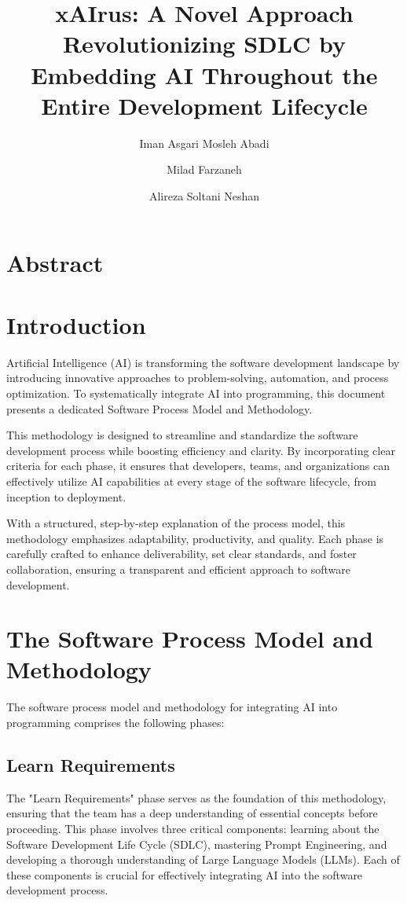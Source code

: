 \documentclass[14pt, a4paper]{article}
\title{xAIrus: A Novel Approach Revolutionizing SDLC by Embedding AI Throughout
the Entire Development Lifecycle}
\author{
    Iman Asgari Mosleh Abadi \and 
    Milad Farzaneh \and 
    Alireza Soltani Neshan
}
\begin{document}
\maketitle

\section{Abstract}

\section{Introduction}

Artificial Intelligence (AI) is transforming the software development landscape
by introducing innovative approaches to problem-solving, automation, and process
optimization. To systematically integrate AI into programming, this document
presents a dedicated Software Process Model and Methodology.

This methodology is designed to streamline and standardize the software
development process while boosting efficiency and clarity. By incorporating
clear criteria for each phase, it ensures that developers, teams, and
organizations can effectively utilize AI capabilities at every stage of the
software lifecycle, from inception to deployment.

With a structured, step-by-step explanation of the process model, this
methodology emphasizes adaptability, productivity, and quality. Each phase is
carefully crafted to enhance deliverability, set clear standards, and foster
collaboration, ensuring a transparent and efficient approach to software
development.

\tableofcontents

\section{The Software Process Model and Methodology}

The software process model and methodology for integrating AI into programming
comprises the following phases:

\subsection{Learn Requirements}

The "Learn Requirements" phase serves as the foundation of this methodology,
ensuring that the team has a deep understanding of essential concepts before
proceeding. This phase involves three critical components: learning about the
Software Development Life Cycle (SDLC), mastering Prompt Engineering, and
developing a thorough understanding of Large Language Models (LLMs). Each of
these components is crucial for effectively integrating AI into the software
development process.
\end{document}
